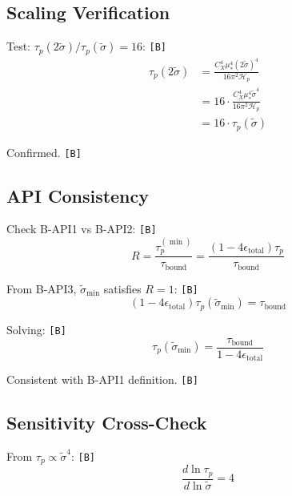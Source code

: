 \documentclass[11pt,a4paper]{article}
\newcommand{\tagB}{\textcolor{purple!70!black}{\texttt{[B]}}}
\theoremstyle{definition}
\begin{document}
\subsection{Scaling Verification}
\label{subsec:scale-cv}

Test: $\tau_p(2\tilde{\sigma})/\tau_p(\tilde{\sigma}) = 16$: \tagB{}
\begin{align}
\label{eq:cv-scale-1}
\tau_p(2\tilde{\sigma}) &= \frac{C_X^4 \mu_*^4 (2\tilde{\sigma})^4}{16\pi^2 \mathcal{H}_p} \\
\label{eq:cv-scale-2}
&= 16 \cdot \frac{C_X^4 \mu_*^4 \tilde{\sigma}^4}{16\pi^2 \mathcal{H}_p} \\
\label{eq:cv-scale-3}
&= 16 \cdot \tau_p(\tilde{\sigma})
\end{align}

Confirmed. \tagB{}

\subsection{API Consistency}
\label{subsec:api-cv}

Check B-API1 vs B-API2: \tagB{}
\begin{equation}
\label{eq:cv-api-1}
R = \frac{\tau_p^{(\min)}}{\tau_{\text{bound}}} = \frac{(1-4\epsilon_{\text{total}})\tau_p}{\tau_{\text{bound}}}
\end{equation}

From B-API3, $\tilde{\sigma}_{\min}$ satisfies $R = 1$: \tagB{}
\begin{equation}
\label{eq:cv-api-2}
(1-4\epsilon_{\text{total}})\tau_p(\tilde{\sigma}_{\min}) = \tau_{\text{bound}}
\end{equation}

Solving: \tagB{}
\begin{equation}
\label{eq:cv-api-3}
\tau_p(\tilde{\sigma}_{\min}) = \frac{\tau_{\text{bound}}}{1-4\epsilon_{\text{total}}}
\end{equation}

Consistent with B-API1 definition. \tagB{}

\subsection{Sensitivity Cross-Check}
\label{subsec:sens-cv}

From $\tau_p \propto \tilde{\sigma}^4$: \tagB{}
\begin{equation}
\label{eq:cv-sens-1}
\frac{d\ln\tau_p}{d\ln\tilde{\sigma}} = 4
\end{equation}
\end{document}
